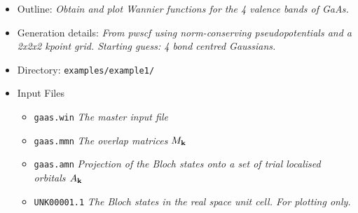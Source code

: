 \documentclass[a4paper,11pt,twoside]{article}
\begin{document}
\begin{itemize}
\item{Outline: \it{Obtain and plot Wannier functions for the 4 valence bands of GaAs.}}
\item{Generation details: \it{From pwscf using norm-conserving pseudopotentials
and a 2x2x2 kpoint grid. Starting guess: 4 bond centred Gaussians.}}
\item{Directory: {\tt examples/example1/}}
\item{Input Files}
\begin{itemize}
\item{ {\tt gaas.win}  {\it The master input file}}
\item{ {\tt gaas.mmn}  {\it The overlap matrices $M_{{\bf k}}$}}
\item{ {\tt gaas.amn}  {\it Projection of the Bloch states onto a set of trial localised orbitals $A_{{\bf k}}$}}
\item{ {\tt UNK00001.1}  {\it The Bloch states in the real space unit cell. For plotting only.}}
\end{itemize}
\end{itemize}
\end{document}
